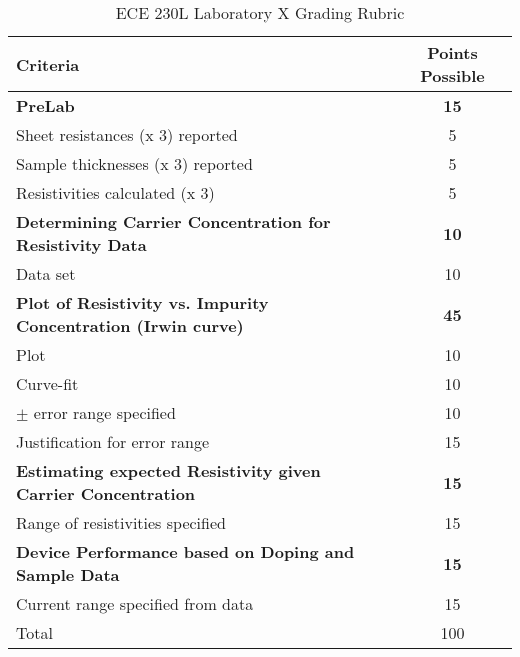 \documentclass[12pt]{../manual}
\begin{document}
\newpage
{}
{}
\hspace{0pt}
\vfill
\begin{table}[ht!]
\caption{ECE 230L Laboratory X Grading Rubric}
\centering
\begin{tabular}{l|c} \hline
Criteria & Points Possible \\ \hline \hline
\textbf{PreLab}	& \textbf{15}\\ 
Sheet resistances (x 3) reported & 5 \\ 
Sample thicknesses (x 3) reported & 5 \\ 
Resistivities calculated (x 3) & 5 \\ \hline
\textbf{Determining Carrier Concentration for Resistivity Data} & \textbf{10} \\ 
Data set & 10 \\ \hline
\textbf{Plot of Resistivity vs. Impurity Concentration (Irwin curve)} & \textbf{45} \\ 
            Plot & 10 \\ 
            Curve-fit & 10 \\ 
            $\pm$ error range specified & 10\\ 
              Justification for error range	& 15 \\ \hline
\textbf{Estimating expected Resistivity given Carrier Concentration} & \textbf{15} \\ 
Range of resistivities specified & 15 \\ \hline
\textbf{Device Performance based on Doping and Sample Data} & \textbf{15} \\ 
              Current range specified from data & 15 \\ \hline \hline
Total	& 100 \\ \hline
\end{tabular}
\end{table}
\vfill
%
\end{document}
